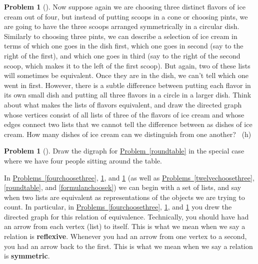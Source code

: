 \documentclass[10pt,]{book}
\newcommand{\terminology}[1]{\textbf{#1}}
\theoremstyle{plain}
\theoremstyle{definition}
\newtheorem{activity}[project]{Problem}
\theoremstyle{definition}
\numberwithin{equation}{chapter}
\newcommand{\importantarrow}{\Rightarrow}
\begin{document}
\begin{activity}[]\marginsymbol[-1em]{\pdftooltip{$\importantarrow$}{especially interesting}} \label{icecreaminadish}
\hypertarget{p-1926}{}%
Now suppose again we are choosing three distinct flavors of ice cream out of four, but instead of putting scoops in a cone or choosing pints, we are going to have the three scoops arranged symmetrically in a circular dish. Similarly to choosing three pints, we can describe a selection of ice cream in terms of which one goes in the dish first, which one goes in second (say to the right of the first), and which one goes in third (say to the right of the second scoop, which makes it to the left of the first scoop). But again, two of these lists will sometimes be equivalent. Once they are in the dish, we can't tell which one went in first. However, there is a subtle difference between putting each flavor in its own small dish and putting all three flavors in a circle in a larger dish. Think about what makes the lists of flavors equivalent, and draw the directed graph whose vertices consist of all lists of three of the flavors of ice cream and whose edges connect two lists that we cannot tell the difference between as dishes of ice cream. How many dishes of ice cream can we distinguish from one another?%
~{\tiny (h)}\end{activity}
\begin{activity}[]\marginsymbol[-1em]{} \label{roundtablefour}
\hypertarget{p-1929}{}%
Draw the digraph for \hyperref[roundtable]{Problem~\ref{roundtable}} in the special case where we have four people sitting around the table.%
\end{activity}
\hypertarget{p-1930}{}%
In \hyperref[fourchoosethree]{Problems~\ref{fourchoosethree}}, \hyperref[icecreaminadish]{\ref{icecreaminadish}}, and \hyperref[roundtablefour]{\ref{roundtablefour}} (as well as \hyperref[twelvechoosethree]{Problems~\ref{twelvechoosethree}}, \hyperref[roundtable]{\ref{roundtable}}, and \hyperref[formulanchoosek]{\ref{formulanchoosek}}) we can begin with a set of lists, and say when two lists are equivalent as representations of the objects we are trying to count. In particular, in \hyperref[fourchoosethree]{Problems~\ref{fourchoosethree}}, \hyperref[icecreaminadish]{\ref{icecreaminadish}}, and \hyperref[roundtablefour]{\ref{roundtablefour}} you drew the directed graph for this relation of equivalence. Technically, you should have had an arrow from each vertex (list) to itself. This is what we mean when we say a relation is \terminology{reflexive}. Whenever you had an arrow from one vertex to a second, you had an arrow back to the first. This is what we mean when we say a relation is \terminology{symmetric}.%
\end{document}
